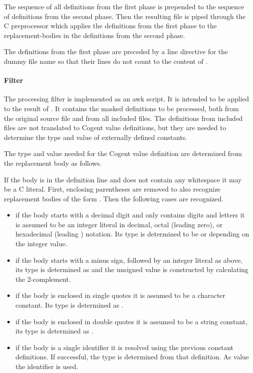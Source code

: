 The sequence of all definitions from the first phase is prepended to the sequence of definitions from the second 
phase. Then the resulting file is piped through the C preprocessor
which applies the definitions from the first phase to the replacement-bodies in the definitions from the
second phase.

The definitions from the first phase are preceded by a line directive for the dummy file name 
so that their lines do not count to the content of .

\paragraph{Filter }

The processing filter is implemented as an awk script. It is intended to be applied to the result of 
. It contains the masked definitions to be processed, both from the original source file
and from all included files. The definitions from included files are not translated to Cogent value
definitions, but they are needed to determine the type and value of externally defined constants.

The type and value needed for the Cogent value definition are determined from the replacement body as follows.

If the body is in the definition line and does not contain any whitespace it may be a C literal. First, 
enclosing parentheses are removed to also recognize replacement bodies of the form . Then 
the following cases are recognized.
\begin{itemize}
\item if the body starts with a decimal digit and only contains digits and letters it is assumed to be an 
integer literal in decimal, octal (leading zero), or hexadecimal (leading ) notation. Its type
is determined to be  or  depending on the integer value.
\item if the body starts with a minus sign, followed by an integer literal as above, its type is
determined as  and the unsigned value is constructed by calculating the 2-complement.
\item if the body is enclosed in single quotes it is assumed to be a character constant. Its type is
determined as .
\item if the body is enclosed in double quotes it is assumed to be a string constant, its type is determined
as .
\item if the body is a single identifier it is resolved using the previous constant definitions. If successful,
the type is determined from that definition. As value the identifier is used.
\end{itemize}

